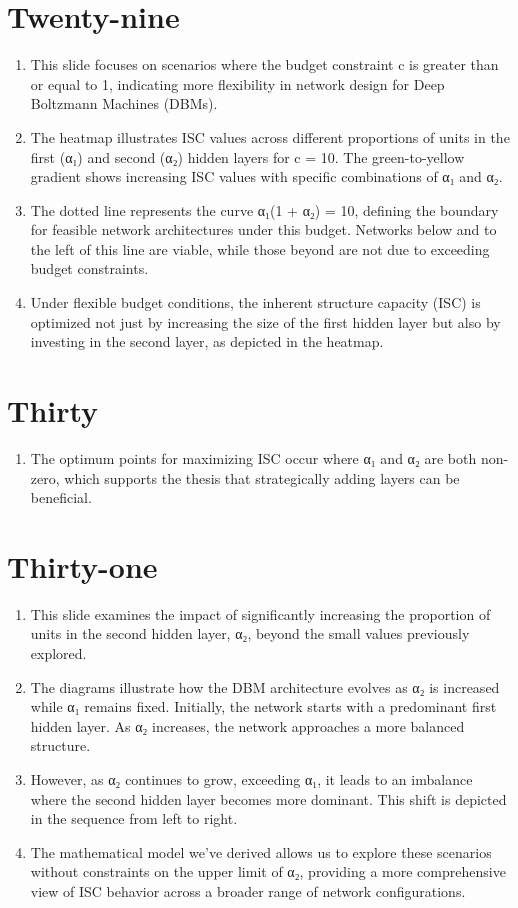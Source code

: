 \documentclass{article}
\begin{document}
\section*{Twenty-nine}
\begin{enumerate}
    \item This slide focuses on scenarios where the budget constraint c is greater than or equal to 1, indicating more flexibility in network design for Deep Boltzmann Machines (DBMs).
    \item The heatmap illustrates ISC values across different proportions of units in the first (α₁) and second (α₂) hidden layers for c = 10. The green-to-yellow gradient shows increasing ISC values with specific combinations of α₁ and α₂.
    \item The dotted line represents the curve α₁(1 + α₂) = 10, defining the boundary for feasible network architectures under this budget. Networks below and to the left of this line are viable, while those beyond are not due to exceeding budget constraints.
    \item Under flexible budget conditions, the inherent structure capacity (ISC) is optimized not just by increasing the size of the first hidden layer but also by investing in the second layer, as depicted in the heatmap.
\end{enumerate}

\section*{Thirty}
\begin{enumerate}
    \item The optimum points for maximizing ISC occur where α₁ and α₂ are both non-zero, which supports the thesis that strategically adding layers can be beneficial.
\end{enumerate}

\section*{Thirty-one}
\begin{enumerate}
    \item This slide examines the impact of significantly increasing the proportion of units in the second hidden layer, α₂, beyond the small values previously explored.
    \item The diagrams illustrate how the DBM architecture evolves as α₂ is increased while α₁ remains fixed. Initially, the network starts with a predominant first hidden layer. As α₂ increases, the network approaches a more balanced structure.
    \item However, as α₂ continues to grow, exceeding α₁, it leads to an imbalance where the second hidden layer becomes more dominant. This shift is depicted in the sequence from left to right.
    \item The mathematical model we've derived allows us to explore these scenarios without constraints on the upper limit of α₂, providing a more comprehensive view of ISC behavior across a broader range of network configurations.
\end{enumerate}
\end{document}
